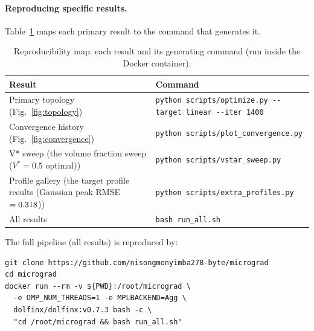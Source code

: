 \paragraph{Reproducing specific results.}
Table~\ref{tab:reproduce} maps each primary result to the
command that generates it.

\begin{table}[h]
\centering\small
\caption{Reproducibility map: each result and its generating command
         (run inside the Docker container).}
\label{tab:reproduce}
\begin{tabular}{@{}p{3.5cm}p{8cm}@{}}
\toprule
\textbf{Result} & \textbf{Command} \\
\midrule
Primary topology (Fig.~\ref{fig:topology}) &
\texttt{python scripts/optimize.py -{}-target linear -{}-iter 1400} \\
Convergence history (Fig.~\ref{fig:convergence}) &
\texttt{python scripts/plot\_convergence.py} \\
V* sweep (the volume fraction sweep ($V^*=0.5$ optimal)) &
\texttt{python scripts/vstar\_sweep.py} \\
Profile gallery (the target profile results (Gaussian peak RMSE~$=0.318$)) &
\texttt{python scripts/extra\_profiles.py} \\
All results & \texttt{bash run\_all.sh} \\
\bottomrule
\end{tabular}
\end{table}

The full pipeline (all results) is reproduced by:
\begin{verbatim}
git clone https://github.com/nisongmonyimba278-byte/micrograd
cd micrograd
docker run --rm -v ${PWD}:/root/micrograd \
  -e OMP_NUM_THREADS=1 -e MPLBACKEND=Agg \
  dolfinx/dolfinx:v0.7.3 bash -c \
  "cd /root/micrograd && bash run_all.sh"
\end{verbatim}

